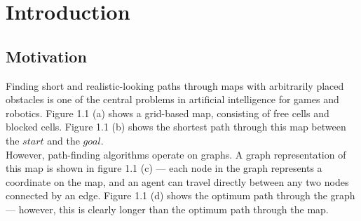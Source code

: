 \documentclass[12pt,notitlepage]{report}
\begin{document}
\chapter{Introduction}

\section{Motivation}

Finding short and realistic-looking paths through maps with arbitrarily placed obstacles is one of the central problems in artificial intelligence for games and robotics. Figure 1.1 (a) shows a grid-based map, consisting of free cells and blocked cells. Figure 1.1 (b) shows the shortest path through this map between the $start$ and the $goal$.\\

\noindent
However, path-finding algorithms operate on graphs. A graph representation of this map is shown in figure 1.1 (c) --- each node in the graph represents a coordinate on the map, and an agent can travel directly between any two nodes connected by an edge. Figure 1.1 (d) shows the optimum path through the graph --- however, this is clearly longer than the optimum path through the map.\\
\end{document}
